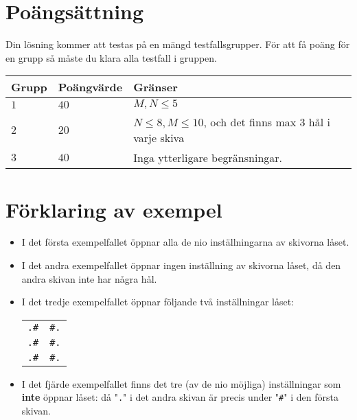 \section*{Poängsättning}
Din lösning kommer att testas på en mängd testfallsgrupper.
För att få poäng för en grupp så måste du klara alla testfall i gruppen.

\noindent
\begin{tabular}{| l | l | l |}
  \hline
  Grupp & Poängvärde & Gränser \\ \hline
  $1$    & $40$        &  $M, N \le 5$ \\ \hline 
  $2$    & $20$        &  $N \le 8, M \le 10$, och det finns max 3 hål i varje skiva \\ \hline 
  $3$    & $40$        &  Inga ytterligare begränsningar. \\ \hline
\end{tabular}

\section*{Förklaring av exempel}

\begin{itemize}
  \item
I det första exempelfallet öppnar alla de nio inställningarna av skivorna låset.

  \item
I det andra exempelfallet öppnar ingen inställning av skivorna låset, då den andra skivan inte har några hål.

  \item
I det tredje exempelfallet öppnar följande två inställningar låset:
\setlength{\tabcolsep}{10pt} %
\begin{center}
  \begin{tabular}{c|c}
    {\raggedleft \texttt{.\#}}& {\raggedright \texttt{\#.}}\\
    {\raggedleft \texttt{.\#}}& {\raggedright \texttt{\#.}}\\
    {\raggedleft \texttt{.\#}}& {\raggedright \texttt{\#.}}
  \end{tabular}
\end{center}

  \item
    I det fjärde exempelfallet finns det tre (av de nio möjliga) inställningar som \textbf{inte} öppnar låset: då "\texttt{.}" i det andra skivan är precis under
    "\texttt{\#}" i den första skivan.

\end{itemize}
